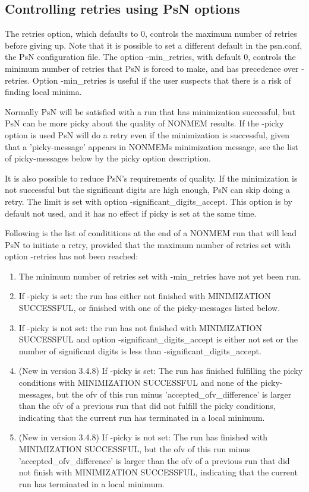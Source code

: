 \subsection{Controlling retries using PsN options}
The retries option, which defaults to 0, controls the maximum number of retries before giving up. Note that it is possible to set a different default in the psn.conf, the PsN configuration file. The option -min\_retries, with default 0, controls the minimum number of retries that PsN is forced to make, and has precedence over -retries. Option -min\_retries is useful if the user suspects that there is a risk of finding local minima.

Normally PsN will be satisfied with a run that has minimization successful, but PsN can be more picky about the quality of NONMEM results. If the -picky option is used PsN will do a retry even if the minimization is successful, given that a 'picky-message' appears in NONMEMs minimization message, see the list of picky-messages below by the picky option description.

It is also possible to reduce PsN's requirements of quality. If the minimization is not successful but the significant digits are high enough, PsN can skip doing a retry. The limit is set with option -significant\_digits\_accept. This option is by default not used, and it has no effect if picky is set at the same time.

Following is the list of condititions at the end of a NONMEM run that will lead PsN to initiate a retry, provided that the maximum number of retries set with option -retries has not been reached:

\begin{enumerate}
\item The minimum number of retries set with -min\_retries have not yet been run.
\item If -picky is set: the run has either not finished with MINIMIZATION SUCCESSFUL, or finished with one of the picky-messages listed below.
\item If -picky is not set: the run has not finished with MINIMIZATION SUCCESSFUL and option -significant\_digits\_accept is either not set or the number of significant digits is less than -significant\_digits\_accept.
\item (New in version 3.4.8) If -picky is set: The run has finished fulfilling the picky conditions with MINIMIZATION SUCCESSFUL and none of the picky-messages, but the ofv of this run minus 'accepted\_ofv\_difference' is larger than the ofv of a previous run that did not fulfill the picky conditions, indicating that the current run has terminated in a local minimum.
\item (New in version 3.4.8) If -picky is not set: The run has finished with MINIMIZATION SUCCESSFUL, but the ofv of this run minus 'accepted\_ofv\_difference' is larger than the ofv of a previous run that did not finish with MINIMIZATION SUCCESSFUL, indicating that the current run has terminated in a local minimum.
\end{enumerate}

